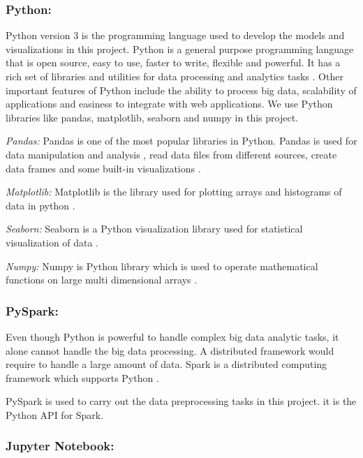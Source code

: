 \documentclass[sigconf]{acmart}
\begin{document}
\subsubsection{Python:}

Python version 3 is the programming language used to develop the models and visualizations in this project. Python is a general purpose programming language that is open source, easy to use, faster to write, flexible and powerful. It has a rich set of libraries and utilities for data processing and analytics tasks \cite{python-important-big-data-analytics-applications}. Other important features of Python include the ability to process big data, scalability of applications and easiness to integrate with web applications. 
We use Python libraries like pandas, matplotlib, seaborn and numpy in this project.

\textit{Pandas:} Pandas is one of the most popular libraries in Python. Pandas is used for data manipulation and analysis \cite{pandas}, read data files from different sources, create data frames and some built-in visualizations \cite{dataconomy-python}.

\textit{Matplotlib:} Matplotlib is the library used for plotting arrays and histograms of data in python \cite{Matplotlib}.

\textit{Seaborn:} Seaborn is a Python visualization library used for statistical visualization of data \cite{seaborn}.

\textit{Numpy:} Numpy is Python library which is used to operate mathematical functions on large multi dimensional arrays \cite{numpy}. 

\subsubsection{PySpark:}

Even though Python is powerful to handle complex big data analytic tasks, it alone cannot handle the big data processing. A distributed framework would require to handle a large amount of data. Spark is a distributed computing framework which supports Python \cite{pyspark}.

PySpark is used to carry out the data preprocessing tasks in this project. it is the Python API for Spark.

\subsubsection{Jupyter Notebook:}
\end{document}
